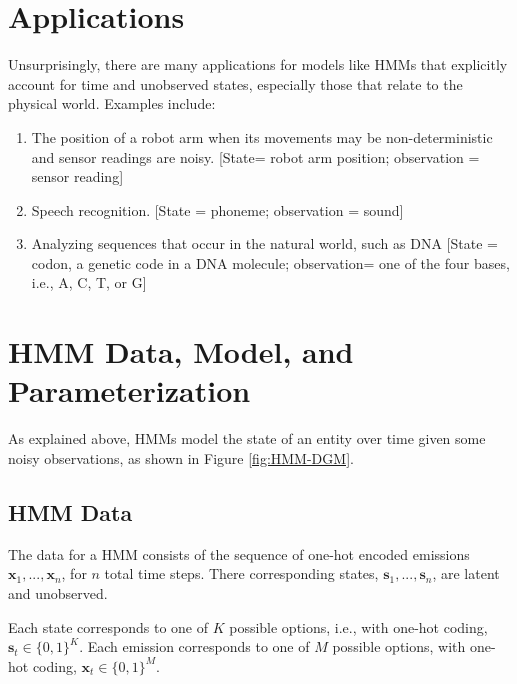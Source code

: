 \section{Applications}

Unsurprisingly, there are many applications for models like HMMs that explicitly account for time and unobserved states, especially those that relate to the physical world. Examples include:
\begin{enumerate}
    \item The position of a robot arm when its movements may be non-deterministic and sensor readings are noisy. [State= robot arm position; observation  = sensor reading]
    \item Speech recognition. [State = phoneme; observation = sound]
    \item Analyzing sequences that occur in the natural world, such as DNA [State = codon, a genetic code in a DNA molecule; observation= one of the four bases, i.e., A, C, T, or G]
\end{enumerate}

\section{HMM Data, Model, and Parameterization}

As explained above, HMMs model the state of an entity over time given some noisy observations, as shown in Figure \ref{fig:HMM-DGM}.

\subsection{HMM Data}

The data for a HMM consists of the sequence of one-hot encoded emissions $\textbf{x}_1, ..., \textbf{x}_n$, for $n$ total time steps. There corresponding states, $\textbf{s}_1, ..., \textbf{s}_n$, are latent and unobserved.

Each state corresponds to one of $K$ possible options, i.e., with one-hot coding,
$\textbf{s}_t \in \{0,1\}^K$. Each emission corresponds to one of $M$ possible options, with one-hot coding, $\textbf{x}_t \in \{0,1\}^M$.



